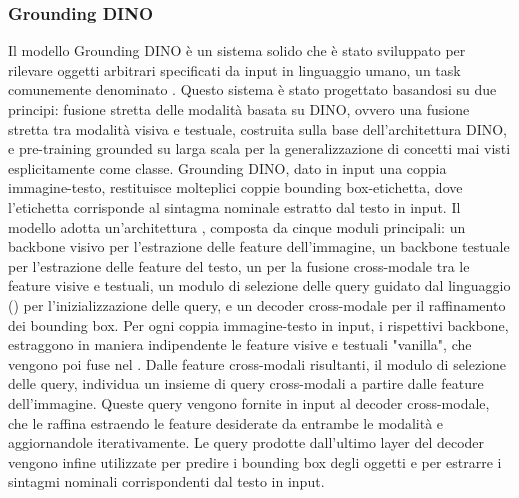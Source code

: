 \subsubsection{Grounding DINO}
Il modello Grounding DINO è un sistema solido che è stato sviluppato per rilevare oggetti arbitrari specificati da input in linguaggio umano, un task comunemente denominato . Questo sistema è stato progettato basandosi su due principi: fusione stretta delle modalità basata su DINO, ovvero una fusione stretta tra modalità visiva e testuale, costruita sulla base dell'architettura DINO, e pre-training grounded su larga scala per la generalizzazione di concetti mai visti esplicitamente come classe.
Grounding DINO, dato in input una coppia immagine-testo, restituisce molteplici coppie bounding box-etichetta, dove l'etichetta corrisponde al sintagma nominale estratto dal testo in input. Il modello adotta un'architettura , composta da cinque moduli principali: un backbone visivo per l'estrazione delle feature dell'immagine, un backbone testuale per l'estrazione delle feature del testo, un  per la fusione cross-modale tra le feature visive e testuali, un modulo di selezione delle query guidato dal linguaggio () per l'inizializzazione delle query, e un decoder cross-modale per il raffinamento dei bounding box. Per ogni coppia immagine-testo in input, i rispettivi backbone, estraggono in maniera indipendente le feature visive e testuali "vanilla", che vengono poi fuse nel . Dalle feature cross-modali risultanti, il modulo di selezione delle query, individua un insieme di query cross-modali a partire dalle feature dell'immagine. Queste query vengono fornite in input al decoder cross-modale, che le raffina estraendo le feature desiderate da entrambe le modalità e aggiornandole iterativamente. Le query prodotte dall'ultimo layer del decoder vengono infine utilizzate per predire i bounding box degli oggetti e per estrarre i sintagmi nominali corrispondenti dal testo in input. \cite{GroundingDINO}
